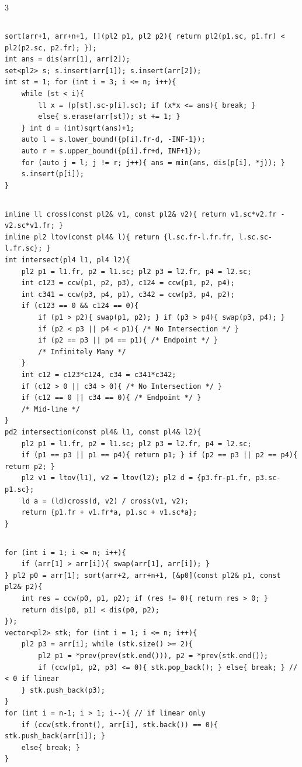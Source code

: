 \documentclass[landscape, 8pt, a4paper, oneside]{extarticle}
\begin{document}
\begin{multicols*}{3}
\subsection{}
\begin{verbatim}
sort(arr+1, arr+n+1, [](pl2 p1, pl2 p2){ return pl2(p1.sc, p1.fr) < pl2(p2.sc, p2.fr); });
int ans = dis(arr[1], arr[2]);
set<pl2> s; s.insert(arr[1]); s.insert(arr[2]);
int st = 1; for (int i = 3; i <= n; i++){
	while (st < i){
		ll x = (p[st].sc-p[i].sc); if (x*x <= ans){ break; }
		else{ s.erase(arr[st]); st += 1; }
	} int d = (int)sqrt(ans)+1;
	auto l = s.lower_bound({p[i].fr-d, -INF-1});
	auto r = s.upper_bound({p[i].fr+d, INF+1});
	for (auto j = l; j != r; j++){ ans = min(ans, dis(p[i], *j)); }
	s.insert(p[i]);
}
\end{verbatim}
\subsection{}
\begin{verbatim}
inline ll cross(const pl2& v1, const pl2& v2){ return v1.sc*v2.fr - v2.sc*v1.fr; }
inline pl2 ltov(const pl4& l){ return {l.sc.fr-l.fr.fr, l.sc.sc-l.fr.sc}; }
int intersect(pl4 l1, pl4 l2){
	pl2 p1 = l1.fr, p2 = l1.sc; pl2 p3 = l2.fr, p4 = l2.sc;
	int c123 = ccw(p1, p2, p3), c124 = ccw(p1, p2, p4);
	int c341 = ccw(p3, p4, p1), c342 = ccw(p3, p4, p2);
	if (c123 == 0 && c124 == 0){
		if (p1 > p2){ swap(p1, p2); } if (p3 > p4){ swap(p3, p4); }
		if (p2 < p3 || p4 < p1){ /* No Intersection */ }
		if (p2 == p3 || p4 == p1){ /* Endpoint */ }
		/* Infinitely Many */
	}
	int c12 = c123*c124, c34 = c341*c342;
	if (c12 > 0 || c34 > 0){ /* No Intersection */ }
	if (c12 == 0 || c34 == 0){ /* Endpoint */ }
	/* Mid-line */
}
pd2 intersection(const pl4& l1, const pl4& l2){
	pl2 p1 = l1.fr, p2 = l1.sc; pl2 p3 = l2.fr, p4 = l2.sc;
	if (p1 == p3 || p1 == p4){ return p1; } if (p2 == p3 || p2 == p4){ return p2; }
	pl2 v1 = ltov(l1), v2 = ltov(l2); pl2 d = {p3.fr-p1.fr, p3.sc-p1.sc};
	ld a = (ld)cross(d, v2) / cross(v1, v2);
	return {p1.fr + v1.fr*a, p1.sc + v1.sc*a};
}
\end{verbatim}
\subsection{}
\begin{verbatim}
for (int i = 1; i <= n; i++){
	if (arr[1] > arr[i]){ swap(arr[1], arr[i]); }
} pl2 p0 = arr[1]; sort(arr+2, arr+n+1, [&p0](const pl2& p1, const pl2& p2){
	int res = ccw(p0, p1, p2); if (res != 0){ return res > 0; }
	return dis(p0, p1) < dis(p0, p2);
});
vector<pl2> stk; for (int i = 1; i <= n; i++){
	pl2 p3 = arr[i]; while (stk.size() >= 2){
		pl2 p1 = *prev(prev(stk.end())), p2 = *prev(stk.end());
		if (ccw(p1, p2, p3) <= 0){ stk.pop_back(); } else{ break; } // < 0 if linear
	} stk.push_back(p3);
}
for (int i = n-1; i > 1; i--){ // if linear only
	if (ccw(stk.front(), arr[i], stk.back()) == 0){ stk.push_back(arr[i]); }
	else{ break; }
}
\end{verbatim}

\end{multicols*}
\end{document}
